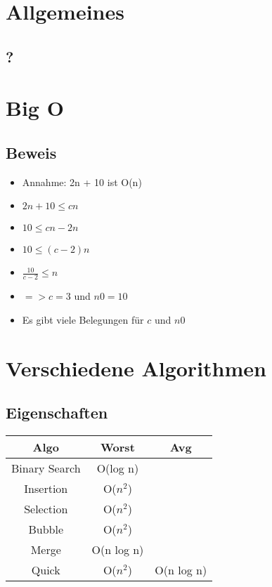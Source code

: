 

\newcommand{\SUBJECT}{}
\newcommand{\TITLE}{Cheat Sheet Objektorientierte Programmierung 2}



\begin{multicols*}{5}
    \setlength{\columnseprule}{0.4pt}
		\footnotesize

\section{Allgemeines}
	\subsection{?}

\section{Big O}

	\subsection{Beweis}
	\begin{itemize}
		\item Annahme: 2n + 10 ist O(n)
		\item $2n + 10 \leq cn$
		\item $10 \leq cn - 2n$
		\item $10 \leq (c - 2)n$
		\item $\frac{10}{c-2} \leq n$
		\item $=> c=3$ und $n0=10$
		\item Es gibt viele Belegungen für $c$ und $n0$
	\end{itemize}

\section{Verschiedene Algorithmen}
	\subsection{Eigenschaften}
	\renewcommand{\arraystretch}{1.1}
	\begin{tabular}{c | c | c}
		Algo & Worst & Avg \\
		\hline
		Binary Search & O(log n) & \\
		Insertion & O($n^2$) &  \\
		Selection & O($n^2$) &  \\
		Bubble & O($n^2$) &  \\
		Merge & O(n log n) &  \\
		Quick & O($n^2$) & O(n log n)
	\end{tabular}
	

\end{multicols*}
